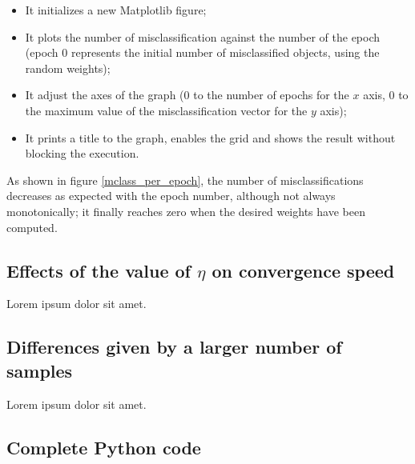 \documentclass[letterpaper,headings=standardclasses]{scrartcl}
\begin{document}
\begin{itemize}

\item It initializes a new Matplotlib figure;

\item It plots the number of misclassification against the number of the epoch (epoch 0 represents the initial number of misclassified objects, using the random weights);

\item It adjust the axes of the graph (0 to the number of epochs for the $x$ axis, 0 to the maximum value of the misclassification vector for the $y$ axis);

\item It prints a title to the graph, enables the grid and shows the result without blocking the execution.

\end{itemize}

As shown in figure \ref{mclass_per_epoch}, the number of misclassifications decreases as expected with the epoch number, although not always monotonically; it finally reaches zero when the desired weights have been computed.

\subsection{Effects of the value of $\eta$ on convergence speed}

Lorem ipsum dolor sit amet.

\subsection{Differences given by a larger number of samples}

Lorem ipsum dolor sit amet.

\subsection{Complete Python code}


\end{document}
